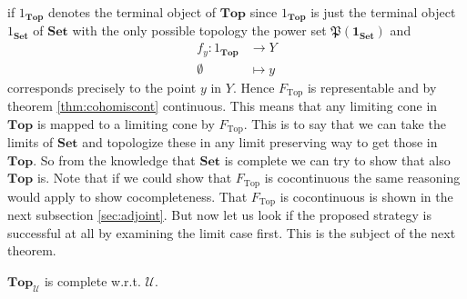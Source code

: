 if $1_{\mathbf{Top}}$ denotes the terminal object of $\mathbf{Top}$ since $1_{\mathbf{Top}}$ is just the terminal object $1_{\mathbf{Set}}$ of $\mathbf{Set}$ with the only possible topology the power set $\mathfrak{P}(\mathbf{1}_{\mathbf{Set}})$ and
\begin{align*}
  f_{y}
  \colon
  1_{\mathbf{Top}}
  &\rightarrow
  Y
  \\
  \emptyset
  &\mapsto
  y
\end{align*}
corresponds precisely to the point $y$ in $Y$. Hence $F_{\mathrm{Top}}$ is representable and by theorem \ref{thm:cohomiscont} continuous. This means that any limiting cone in $\mathbf{Top}$ is mapped to a limiting cone by $F_{\mathrm{Top}}$. This is to say that we can take the limits of $\mathbf{Set}$ and topologize these in any limit preserving way to get those in $\mathbf{Top}$. So from the knowledge that $\mathbf{Set}$ is complete we can try to show that also $\mathbf{Top}$ is. Note that if we could show that $F_{\mathrm{Top}}$ is cocontinuous the same reasoning would apply to show cocompleteness. That $F_{\mathrm{Top}}$ is cocontinuous is shown in the next subsection \ref{sec:adjoint}. But now let us look if the proposed strategy is successful at all by examining the limit case first. This is the subject of the next theorem.
\\
\begin{thm}
\label{thm:topcomplete}
$\mathbf{Top}_{\mathcal{U}}$ is complete w.r.t. $\mathcal{U}$.
\end{thm}
